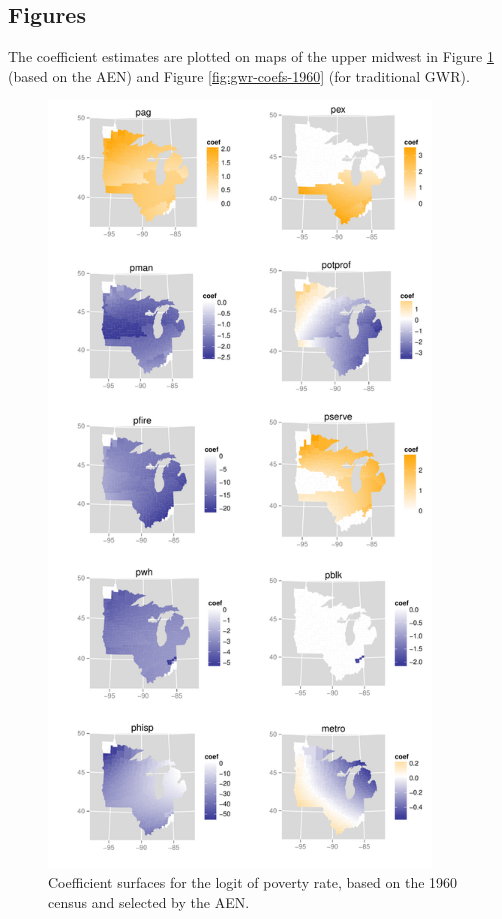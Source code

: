 \documentclass[authoryear, review, 11pt]{elsarticle}
\begin{document}
	\subsection{Figures}
	The coefficient estimates are plotted on maps of the upper midwest in Figure \ref{fig:unshrunk-enet-coefs-1960} (based on the AEN) and Figure \ref{fig:gwr-coefs-1960} (for traditional GWR).
	\begin{figure}
		\begin{center}
			\includegraphics[height=8in]{../../figures/poverty/1960-enet-linear-coefficients-unshrunk.pdf}
			\caption{Coefficient surfaces for the logit of poverty rate, based on the 1960 census and selected by the AEN. \label{fig:unshrunk-enet-coefs-1960}}
		\end{center}
	\end{figure}	
	
\end{document}
